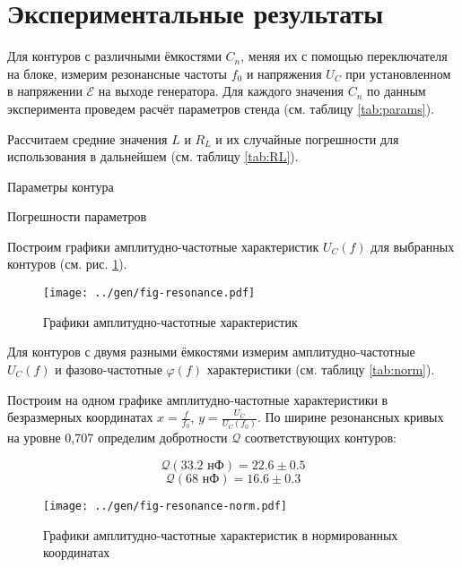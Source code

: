 \section*{Экспериментальные результаты}

Для контуров с различными ёмкостями $C_n$, меняя их с помощью переключателя на блоке, измерим резонансные частоты $f_0$ и напряжения $U_C$ при установленном в напряжении $\mathscr{E}$ на выходе генератора. Для каждого значения $C_n$ по данным эксперимента проведем расчёт параметров стенда (см. таблицу \ref{tab:params}).

Рассчитаем средние значения $L$ и $R_L$ и их случайные погрешности для использования в дальнейшем (см. таблицу \ref{tab:RL}).

\begin{table}[H]
	\centering
	\footnotesize
	
	\caption{Параметры контура}
	\label{tab:params}
\end{table}

\begin{table}[H]
	\centering
	\footnotesize
	
	\caption{Погрешности параметров}
	\label{tab:RL}
\end{table}

Построим графики амплитудно-частотные характеристик $U_C(f)$ для выбранных контуров (см. рис. \ref{fig:resonance}).

\begin{figure}[h]
	\centering
	\texttt{[image: ../gen/fig-resonance.pdf]}
	\caption{Графики амплитудно-частотные характеристик}
	\label{fig:resonance}
\end{figure}

\clearpage

Для контуров с двумя разными ёмкостями измерим амплитудно-частотные $U_C(f)$ и  фазово-частотные $\varphi(f)$ характеристики (см. таблицу \ref{tab:norm}).


Построим на одном графике амплитудно-частотные характеристики в безразмерных координатах $x = \frac{f}{f_0}$, $y = \frac{U_C}{U_C(f_0)}$. По ширине резонансных кривых на уровне 0,707
определим добротности $\mathcal{Q}$ соответствующих контуров:

$$\mathcal{Q}\left(33.2 \text{ нФ}\right) = 22.6 \pm 0.5$$
$$\mathcal{Q}\left(68 \text{ нФ}\right) = 16.6 \pm 0.3$$

\begin{figure}[H]
	\centering
	\texttt{[image: ../gen/fig-resonance-norm.pdf]}
	\caption{Графики амплитудно-частотные характеристик в нормированных координатах}
	\label{fig:norm}
\end{figure}


